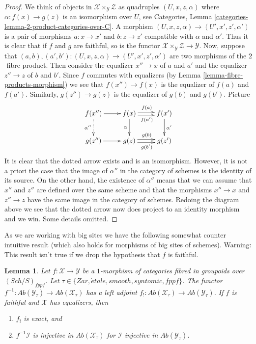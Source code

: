\documentclass{stacks-project}
\theoremstyle{plain}
\newtheorem{lemma}[subsection]{Lemma}
\theoremstyle{definition}
\theoremstyle{remark}
\numberwithin{equation}{subsection}
\def\Sch{\mathit{Sch}}
\def\etale{{\acute{e}tale}}
\begin{document}
\begin{proof}
We think of objects in $\mathcal{X} \times_\mathcal{Y} \mathcal{Z}$ as
quadruples $(U, x, z, \alpha)$ where $\alpha : f(x) \to g(z)$ is an
isomorphism over $U$, see
Categories, Lemma \ref{categories-lemma-2-product-categories-over-C}.
A morphism $(U, x, z, \alpha) \to (U', x', z', \alpha')$ is a
pair of morphisms $a : x \to x'$ and $b : z \to z'$ compatible
with $\alpha$ and $\alpha'$. Thus it is clear that if $f$ and
$g$ are faithful, so is the functor
$\mathcal{X} \times_\mathcal{Y} \mathcal{Z} \to \mathcal{Y}$.
Now, suppose that
$(a, b), (a', b') : (U, x, z, \alpha) \to (U', x', z', \alpha')$
are two morphisms of the $2$-fibre product. Then consider the equalizer
$x'' \to x$ of $a$ and $a'$ and the equalizer $z'' \to z$ of $b$ and $b'$.
Since $f$ commutes with equalizers (by
Lemma \ref{lemma-fibre-products-morphism})
we see that $f(x'') \to f(x)$ is the equalizer of $f(a)$ and $f(a')$.
Similarly, $g(z'') \to g(z)$ is the equalizer of $g(b)$ and $g(b')$.
Picture
$$
\xymatrix{
f(x'') \ar[r] \ar@{..>}[d]_{\alpha''}&
f(x) \ar[d]_\alpha
\ar@<0.5ex>[r]^{f(a)}
\ar@<-0.5ex>[r]_{f(a')}
 &
f(x') \ar[d]^{\alpha'} \\
g(z'') \ar[r] &
g(z)
\ar@<0.5ex>[r]^{g(b)}
\ar@<-0.5ex>[r]_{g(b')}
 &
g(z')
}
$$
It is clear that the dotted arrow exists and is an isomorphism.
However, it is not a priori the case that the image of $\alpha''$
in the category of schemes is the identity of its source. On the other
hand, the existence of $\alpha''$ means that we can assume that $x''$
and $z''$ are defined over the same scheme and that the morphisms
$x'' \to x$ and $z'' \to z$ have the same image in the category of schemes.
Redoing the diagram above we see that the dotted arrow now does
project to an identity morphism and we win. Some details omitted.
\end{proof}

\noindent
As we are working with big sites we have the following somewhat
counter intuitive result (which also holds for morphisms of big sites
of schemes). Warning: This result isn't true if we drop the hypothesis
that $f$ is faithful.

\begin{lemma}
\label{lemma-pullback-injective}
Let $f : \mathcal{X} \to \mathcal{Y}$ be a $1$-morphism of categories
fibred in groupoids over $(\Sch/S)_{fppf}$. Let
$\tau \in \{Zar, \etale, smooth, syntomic, fppf\}$.
The functor
$f^{-1} : \textit{Ab}(\mathcal{Y}_\tau) \to \textit{Ab}(\mathcal{X}_\tau)$
has a left adjoint
$f_! : \textit{Ab}(\mathcal{X}_\tau) \to \textit{Ab}(\mathcal{Y}_\tau)$.
If $f$ is faithful and $\mathcal{X}$ has equalizers, then
\begin{enumerate}
\item $f_!$ is exact, and
\item $f^{-1}\mathcal{I}$ is injective in $\textit{Ab}(\mathcal{X}_\tau)$
for $\mathcal{I}$ injective in $\textit{Ab}(\mathcal{Y}_\tau)$.
\end{enumerate}
\end{lemma}
\end{document}
